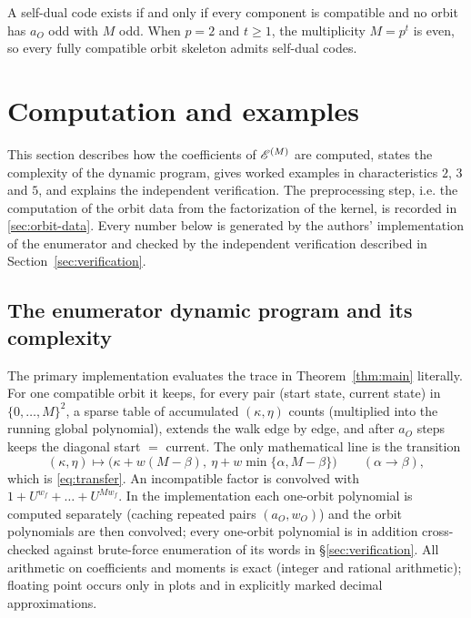 \begin{corollary}\label{cor:self-dual}
A self-dual code exists if and only if every component is compatible and no
orbit has $a_O$ odd with $M$ odd.  When $p=2$ and $t\geq1$, the multiplicity
$M=p^t$ is even, so every fully compatible orbit skeleton admits self-dual
codes.
\end{corollary}

\section{Computation and examples}\label{sec:examples}

This section describes how the coefficients of $\mathscr E^{(M)}$ are computed,
states the complexity of the dynamic program, gives worked examples in
characteristics $2$, $3$ and $5$, and explains the independent verification.
The preprocessing step, i.e. the computation of the orbit data from the
factorization of the kernel, is recorded in \ref{sec:orbit-data}.  Every number below is generated by the
authors' implementation of the enumerator and checked by the independent
verification described in Section~\ref{sec:verification}.

\subsection{The enumerator dynamic program and its complexity}
\label{sec:dp}

The primary implementation evaluates the trace in
Theorem~\ref{thm:main} literally.  For one compatible orbit it keeps, for
every pair (start state, current state) in $\{0,\ldots,M\}^2$, a sparse
table of accumulated $(\kappa,\eta)$ counts (multiplied into the running
global polynomial), extends the walk edge by edge, and after $a_O$ steps keeps
the diagonal start $=$ current.  The only mathematical line is the transition
{\small
\[
(\kappa,\eta)\longmapsto
 \bigl(\kappa+w(M-\beta),\ \eta+w\min\{\alpha,M-\beta\}\bigr)
 \qquad(\alpha\to\beta),
\]
}
which is \eqref{eq:transfer}.  An incompatible factor is convolved with
$1+U^{w_f}+\dots+U^{Mw_f}$.  In the implementation each one-orbit polynomial is
computed separately (caching repeated pairs $(a_O,w_O)$) and the orbit
polynomials are then convolved; every one-orbit polynomial is in addition
cross-checked against brute-force enumeration of its words in
\S\ref{sec:verification}.  All arithmetic on
coefficients and moments is exact (integer and rational arithmetic); floating
point occurs only in plots and in explicitly marked decimal approximations.

